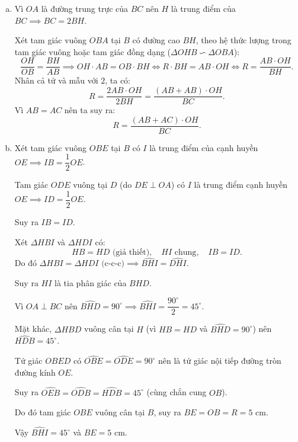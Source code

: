 \begin{bt}
{\begin{enumerate}[a)]
			Lại có $OB = OC = R$ nên $OA$ là đường trung trực của đoạn thẳng $BC$, suy ra $OA \perp BC$ tại $H$.
			
			Tứ giác $OBAC$ có $\widehat{ABO} + \widehat{ACO} = 90^\circ + 90^\circ = 180^\circ$, do đó $OBAC$ là tứ giác nội tiếp đường tròn đường kính $OA$.
			\item Vì $OA$ là đường trung trực của $BC$ nên $H$ là trung điểm của $BC \implies BC = 2BH$.
			
			Xét tam giác vuông $OBA$ tại $B$ có đường cao $BH$, theo hệ thức lượng trong tam giác vuông hoặc tam giác đồng dạng ($\Delta OHB \backsim \Delta OBA$):
			$$\dfrac{OH}{OB} = \dfrac{BH}{AB} \implies OH \cdot AB = OB \cdot BH \iff R \cdot BH = AB \cdot OH \iff R = \dfrac{AB \cdot OH}{BH}.$$
			Nhân cả tử và mẫu với $2$, ta có:
			$$R = \dfrac{2AB \cdot OH}{2BH} = \dfrac{(AB + AB) \cdot OH}{BC}.$$
			Vì $AB = AC$ nên ta suy ra:
			$$R = \dfrac{(AB + AC) \cdot OH}{BC}.$$
			\item Xét tam giác vuông $OBE$ tại $B$ có $I$ là trung điểm của cạnh huyền $OE \implies IB = \dfrac{1}{2}OE$.
			
			Tam giác $ODE$ vuông tại $D$ (do $DE \perp OA$) có $I$ là trung điểm cạnh huyền $OE \implies ID = \dfrac{1}{2}OE$.
			
			Suy ra $IB = ID$.
			
			Xét $\Delta HBI$ và $\Delta HDI$ có:
			$$HB = HD\text{ (giả thiết)},\quad HI\text{ chung},\quad IB = ID.$$
			Do đó $\Delta HBI = \Delta HDI\text{ (c-c-c)} \implies \widehat{BHI} = \widehat{DHI}$.
			
			Suy ra $HI$ là tia phân giác của $\widehat{BHD}$.
			
			Vì $OA \perp BC$ nên $\widehat{BHD} = 90^\circ \implies \widehat{BHI} = \dfrac{90^\circ}{2} = 45^\circ$.
			
			Mặt khác, $\Delta HBD$ vuông cân tại $H$ (vì $HB = HD$ và $\widehat{BHD} = 90^\circ$) nên $\widehat{HDB} = 45^\circ$.
			
			Tứ giác $OBED$ có $\widehat{OBE} = \widehat{ODE} = 90^\circ$ nên là tứ giác nội tiếp đường tròn đường kính $OE$.
			
			Suy ra $\widehat{OEB} = \widehat{ODB} = \widehat{HDB} = 45^\circ$ (cùng chắn cung $OB$).
			
			Do đó tam giác $OBE$ vuông cân tại $B$, suy ra $BE = OB = R = 5\text{ cm}$.
			
			Vậy $\widehat{BHI} = 45^\circ$ và $BE = 5\text{ cm}$.
		\end{enumerate}
}
\end{bt}


